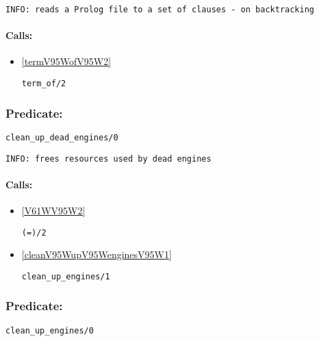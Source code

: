 {\small \begin{verbatim}
INFO: reads a Prolog file to a set of clauses - on backtracking

\end{verbatim}}
\paragraph{Calls:} 
\begin{itemize}
\item \ref{termV95WofV95W2} 
\begin{verbatim}
term_of/2
\end{verbatim}

\end{itemize}

\subsubsection{Predicate:} \label{cleanV95WupV95WdeadV95WenginesV95W0}

\begin{verbatim}
clean_up_dead_engines/0
\end{verbatim}

{\small \begin{verbatim}
INFO: frees resources used by dead engines

\end{verbatim}}
\paragraph{Calls:} 
\begin{itemize}
\item \ref{V61WV95W2} 
\begin{verbatim}
(=)/2
\end{verbatim}

\item \ref{cleanV95WupV95WenginesV95W1} 
\begin{verbatim}
clean_up_engines/1
\end{verbatim}

\end{itemize}

\subsubsection{Predicate:} \label{cleanV95WupV95WenginesV95W0}

\begin{verbatim}
clean_up_engines/0
\end{verbatim}

